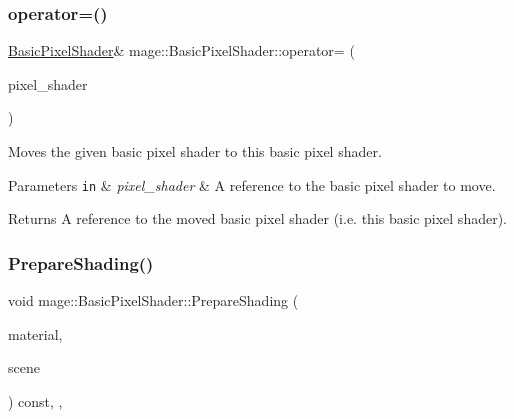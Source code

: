 \subsubsection{\texorpdfstring{operator=()}{operator=()}\hspace{0.1cm}{\footnotesize\ttfamily [2/2]}}
{\footnotesize\ttfamily \hyperlink{classmage_1_1_basic_pixel_shader}{Basic\+Pixel\+Shader}\& mage\+::\+Basic\+Pixel\+Shader\+::operator= (\begin{DoxyParamCaption}\item[{\hyperlink{classmage_1_1_basic_pixel_shader}{Basic\+Pixel\+Shader} \&\&}]{pixel\+\_\+shader }\end{DoxyParamCaption})\hspace{0.3cm}{\ttfamily [delete]}}

Moves the given basic pixel shader to this basic pixel shader.


\begin{DoxyParams}[1]{Parameters}
\mbox{\tt in}  & {\em pixel\+\_\+shader} & A reference to the basic pixel shader to move. \\
\hline
\end{DoxyParams}
\begin{DoxyReturn}{Returns}
A reference to the moved basic pixel shader (i.\+e. this basic pixel shader). 
\end{DoxyReturn}
\hypertarget{classmage_1_1_basic_pixel_shader_a95b6a4ed73ac8c9b31348e93f1fdf99d}{}\label{classmage_1_1_basic_pixel_shader_a95b6a4ed73ac8c9b31348e93f1fdf99d} 
\subsubsection{\texorpdfstring{Prepare\+Shading()}{PrepareShading()}}
{\footnotesize\ttfamily void mage\+::\+Basic\+Pixel\+Shader\+::\+Prepare\+Shading (\begin{DoxyParamCaption}\item[{const \hyperlink{structmage_1_1_material}{Material} \&}]{material,  }\item[{const \hyperlink{structmage_1_1_scene_info}{Scene\+Info} \&}]{scene }\end{DoxyParamCaption}) const\hspace{0.3cm}{\ttfamily [final]}, {\ttfamily [override]}, {\ttfamily [virtual]}}


